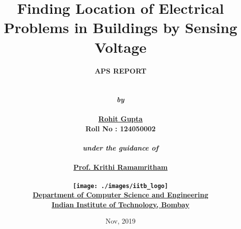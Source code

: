 \title{\textbf{Finding Location of Electrical Problems in Buildings by Sensing Voltage}}
\vspace{2.5cm}
\author{\bf{APS REPORT}\\
        \\
		\\
        \emph{by}\\
        \\
        \href{http://www.cse.iitb.ac.in/~rohitg/}{\bf{Rohit Gupta}}\\
        \bf{Roll No : 124050002}\\
        \\
        \emph{under the guidance of}\\
        \\
        \href{http://www.cse.iitb.ac.in/~krithi/}{\bf{Prof. Krithi Ramamritham}}\\
        \\
        \texttt{[image: ./images/iitb\_logo]}\\
        \href{http://www.cse.iitb.ac.in/}{\bf{Department of Computer Science and Engineering}}\\
        \href{http://www.iitb.ac.in/}{\bf{Indian Institute of Technology, Bombay}}\\
}
\date{Nov, 2019}



\setlength{\headheight}{15pt}

\pagestyle{fancy}

